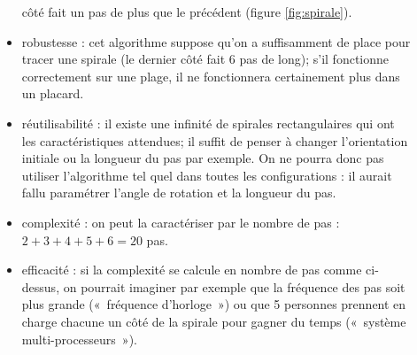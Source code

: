 \begin{description}
\begin{itemize}
		côté fait un pas de plus que le précédent (figure \ref{fig:spirale}).
	\item robustesse : cet algorithme suppose qu'on a suffisamment de place pour
		tracer une spirale (le dernier côté fait 6 pas de long); s'il fonctionne 
		correctement sur une plage, il ne fonctionnera certainement plus dans un
		placard.
	\item réutilisabilité : il existe une infinité de spirales rectangulaires
		qui ont les caractéristiques attendues; il suffit de penser
		à changer l'orientation initiale ou la longueur du pas par exemple. 
		On ne pourra donc pas utiliser l'algorithme tel quel dans toutes les
		configurations : il aurait fallu paramétrer l'angle de rotation et la
		longueur du pas.
	\item complexité : on peut la caractériser par le nombre de pas : 
		$2 + 3 + 4 + 5 + 6 = 20$ pas.
	\item efficacité : si la complexité se calcule en nombre de pas comme
		ci-dessus, on pourrait imaginer par exemple que la fréquence des
		pas soit plus grande («~fréquence d'horloge~») ou que 
		5 personnes prennent en charge chacune un côté de la spirale 
		pour gagner du temps («~système multi-processeurs~»).
	\end{itemize}
\end{description}
